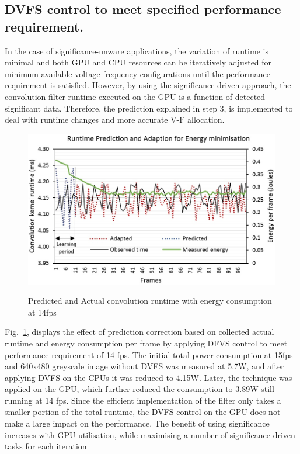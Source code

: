 \documentclass[journal]{IEEEtran}
\begin{document}
\subsection{DVFS control to meet specified performance requirement.} 
 In the case of significance-unware applications, the variation of runtime is minimal and both GPU and CPU resources can be iteratively adjusted for minimum available voltage-frequency configurations until the performance requirement is satisfied. However, by using the significance-driven approach, the convolution filter runtime executed on the GPU is a function of detected significant data. Therefore, the prediction explained in step 3, is implemented to deal with runtime changes and more accurate V-F allocation. 
\begin{figure}[htbp]
  \centering
    \caption{Predicted and Actual convolution runtime with energy consumption at 14fps  }
    \includegraphics[width=\columnwidth]{RuntimePrediction.jpg}
  \label{fig:RunPred}
\end{figure}
Fig.~\ref{fig:RunPred}, displays the effect of prediction correction based on collected actual runtime and energy consumption per frame by applying DFVS control to meet performance requirement of 14 fps. The initial total power consumption at 15fps and 640x480 greyscale image without DVFS was measured at 5.7W, and after applying DVFS on the CPUs it was reduced to 4.15W. Later, the technique was applied on the GPU, which further reduced the consumption to 3.89W still running at 14 fps. Since the efficient implementation of the filter only takes a smaller portion of the total runtime, the DVFS control on the GPU does not make a large impact on the performance. The benefit of using significance increases with GPU utilisation, while maximising a number of significance-driven tasks for each iteration
\end{document}
